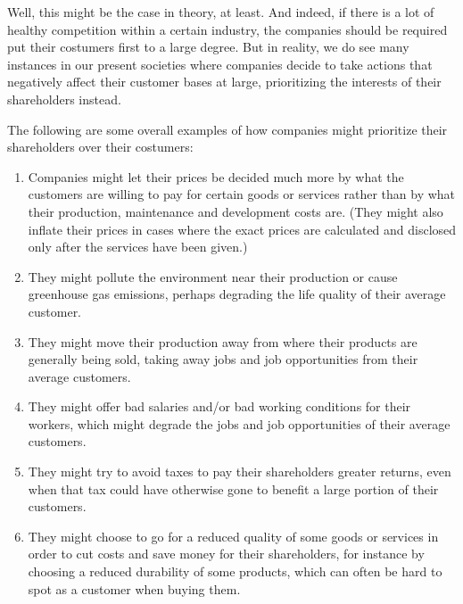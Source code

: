 \documentclass{article}
\begin{document}
\vspace{0.8em}

\noindent Well, this might be the case in theory, at least.  And indeed, if there is a lot of healthy competition within a certain industry, the companies should be required put their costumers first to a large degree.
But in reality, we do see many instances in our present societies where companies decide to take actions that negatively affect their customer bases at large, prioritizing the interests of their shareholders instead. 


The following are some overall examples of how companies might prioritize their shareholders over their costumers: 
\begin{enumerate}
	\item Companies might let their prices be decided much more by what the customers are willing to pay for certain goods or services rather than by what their production, maintenance and development costs are.
	(They might also inflate their prices in cases where the exact prices are calculated and disclosed only after the services have been given.)

	\item They might pollute the environment near their production or cause greenhouse gas emissions, perhaps degrading the life quality of their average customer. 
	
	\item They might move their production away from where their products are generally being sold, taking away jobs and job opportunities from their average customers.
	
	\item They might offer bad salaries and/or bad working conditions for their workers, which might degrade the jobs and job opportunities of their average customers.

	\item They might try to avoid taxes to pay their shareholders greater returns, even when that tax could have otherwise gone to benefit a large portion of their customers.

	\item They might choose to go for a reduced quality of some goods or services in order to cut costs and save money for their shareholders, for instance by choosing a reduced durability of some products, which can often be hard to spot as a customer when buying them. %
	

\end{enumerate}
\end{document}
